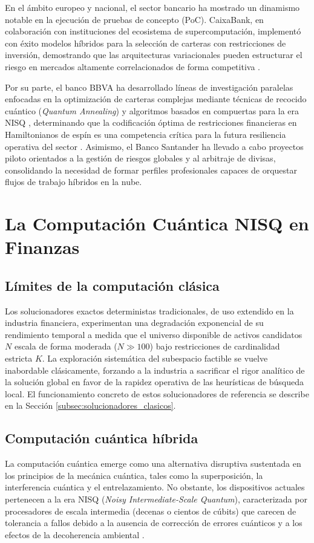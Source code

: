En el ámbito europeo y nacional, el sector bancario ha mostrado un dinamismo notable en la ejecución de pruebas de concepto (PoC). CaixaBank, en colaboración con instituciones del ecosistema de supercomputación, implementó con éxito modelos híbridos para la selección de carteras con restricciones de inversión, demostrando que las arquitecturas variacionales pueden estructurar el riesgo en mercados altamente correlacionados de forma competitiva \cite{Caixabank2019}.

Por su parte, el banco BBVA ha desarrollado líneas de investigación paralelas enfocadas en la optimización de carteras complejas mediante técnicas de recocido cuántico (\textit{Quantum Annealing}) y algoritmos basados en compuertas para la era NISQ \cite{Bbva2020}, determinando que la codificación óptima de restricciones financieras en Hamiltonianos de espín es una competencia crítica para la futura resiliencia operativa del sector \cite{Mugel2022}. Asimismo, el Banco Santander ha llevado a cabo proyectos piloto orientados a la gestión de riesgos globales y al arbitraje de divisas, consolidando la necesidad de formar perfiles profesionales capaces de orquestar flujos de trabajo híbridos en la nube.

\section{La Computación Cuántica NISQ en Finanzas}
\label{sec:paradigma_cuantico}

\subsection{Límites de la computación clásica}
Los solucionadores exactos deterministas tradicionales, de uso extendido en la industria financiera, experimentan una degradación exponencial de su rendimiento temporal a medida que el universo disponible de activos candidatos $N$ escala de forma moderada ($N \gg 100$) bajo restricciones de cardinalidad estricta $K$. La exploración sistemática del subespacio factible se vuelve inabordable clásicamente, forzando a la industria a sacrificar el rigor analítico de la solución global en favor de la rapidez operativa de las heurísticas de búsqueda local. El funcionamiento concreto de estos solucionadores de referencia se describe en la Sección \ref{subsec:solucionadores_clasicos}.

\subsection{Computación cuántica híbrida}
La computación cuántica emerge como una alternativa disruptiva sustentada en los principios de la mecánica cuántica, tales como la superposición, la interferencia cuántica y el entrelazamiento. No obstante, los dispositivos actuales pertenecen a la era NISQ (\textit{Noisy Intermediate-Scale Quantum}), caracterizada por procesadores de escala intermedia (decenas o cientos de cúbits) que carecen de tolerancia a fallos debido a la ausencia de corrección de errores cuánticos y a los efectos de la decoherencia ambiental \cite{Preskill2018}.

